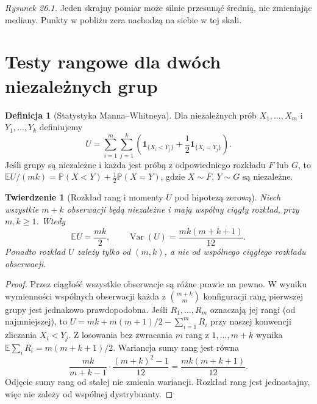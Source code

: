 \documentclass[11pt,a4paper,oneside]{report}
\numberwithin{equation}{chapter}
\theoremstyle{plain}
\newtheorem{twierdzenie}{Twierdzenie}[chapter]
\theoremstyle{definition}
\newtheorem{definicja}{Definicja}[chapter]
\theoremstyle{remark}
\newcommand{\Prob}{\mathbb P}
\newcommand{\E}{\mathbb E}
\newcommand{\Var}{\operatorname{Var}}
\newcommand{\ind}[1]{\mathbf 1_{#1}}
\begin{document}
\begin{center}

{\small\emph{Rysunek 26.1.} Jeden skrajny pomiar może silnie przesunąć średnią,\newline
nie zmieniając mediany. Punkty w pobliżu zera nachodzą na siebie w tej skali.}
\end{center}

\section{Testy rangowe dla dwóch niezależnych grup}
\begin{definicja}[Statystyka Manna--Whitneya]
\label{def:mann-whitney}
Dla niezależnych prób $X_1,\ldots,X_m$ i
$Y_1,\ldots,Y_k$ definiujemy
\[
 U=\sum_{i=1}^m\sum_{j=1}^k
 \left(\ind{\{X_i<Y_j\}}+
 \frac12\ind{\{X_i=Y_j\}}\right).
\]
Jeśli grupy są niezależne i każda jest próbą
z odpowiedniego rozkładu $F$ lub $G$, to
$\E U/(mk)=\Prob(X<Y)+\tfrac12\Prob(X=Y)$,
gdzie $X\sim F$, $Y\sim G$ są niezależne.
\end{definicja}

\begin{twierdzenie}[Rozkład rang i momenty $U$ pod hipotezą zerową]
\label{thm:mann-whitney-moments}
Niech wszystkie $m+k$ obserwacji będą niezależne
i mają wspólny \emph{ciągły} rozkład, przy $m,k\ge1$.
Wtedy
\[
 \E U=\frac{mk}{2},\qquad
 \Var(U)=\frac{mk(m+k+1)}{12}.
\]
Ponadto rozkład $U$ zależy tylko od $(m,k)$,
a nie od wspólnego ciągłego rozkładu obserwacji.
\end{twierdzenie}
\begin{proof}
Przez ciągłość wszystkie obserwacje są różne prawie na pewno.
W wyniku wymienności wspólnych obserwacji każda z
$\binom{m+k}{m}$ konfiguracji rang pierwszej grupy
jest jednakowo prawdopodobna. Jeśli $R_1,\ldots,R_m$
oznaczają jej rangi (od najmniejszej), to
$U=mk+m(m+1)/2-\sum_{i=1}^mR_i$ przy naszej
konwencji zliczania $X_i<Y_j$.
Z losowania bez zwracania $m$ rang z $1,\ldots,m+k$
wynika $\E\sum_iR_i=m(m+k+1)/2$.
Wariancja sumy rang jest równa
\[
 \frac{mk}{m+k-1}\cdot
 \frac{(m+k)^2-1}{12}
 =\frac{mk(m+k+1)}{12}.
\]
Odjęcie sumy rang od stałej nie zmienia wariancji.
Rozkład rang jest jednostajny, więc nie zależy od
wspólnej dystrybuanty.
\end{proof}
\end{document}
